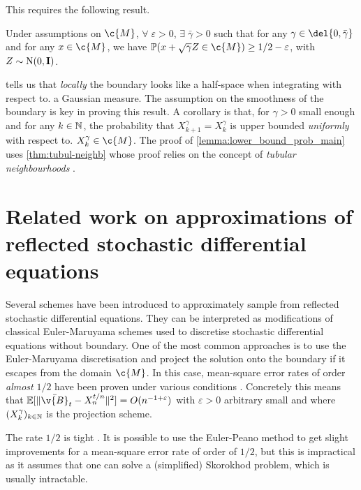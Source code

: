 This requires the following result.
\begin{proposition}
	\label{lemma:lower_bound_prob_main}
	Under assumptions on \(\c{M}\), \(\forall \; \varepsilon > 0\), \(\exists \; \bar{\gamma} >0\) such that for any \(\gamma \in \del{0, \bar{\gamma}}\) and for any \(x \in \c{M}\), we have \(\mathbb{P}(x + \sqrt{\gamma} Z \in \c{M}) \geq 1/2-\varepsilon\), with \(Z \sim \mathrm{N}(0, \m{I})\).
\end{proposition}

 tells us that \emph{locally} the boundary
looks like a half-space when integrating with respect to. a Gaussian measure.
The assumption on the smoothness of the boundary is key in proving this result.
A corollary is that, for \(\gamma > 0\) small enough and for any \(k \in \mathbb{N}\), the probability that \(X_{k+1}^\gamma = X_k^\gamma\) is upper bounded \emph{uniformly} with respect to.
\(X_k^\gamma \in \c{M}\).
The proof of \cref{lemma:lower_bound_prob_main} uses \cref{thm:tubul-neighb} whose proof relies on the concept of \emph{tubular neighbourhoods} \parencite{lee2013smooth}.

\section{Related work on approximations of reflected stochastic differential equations}

Several schemes have been introduced to approximately sample from reflected stochastic differential equations.
They can be interpreted as modifications of classical Euler-Maruyama schemes used to discretise stochastic differential equations without boundary.
One of the most common approaches is to use the Euler-Maruyama discretisation and project the solution onto the boundary if it escapes from the domain \(\c{M}\).
In this case, mean-square error rates of order \emph{almost} \(1/2\) have been proven under various conditions \parencite{liu1995discretization,chitashvili1981strong,pettersson1995approximations,slominski1994approximation}.
Concretely this means that \(\E[\| \bar{\v{B}}_{t} - X_{n}^{t/n}\|^2] = O(n^{-1+\varepsilon})\) with \(\varepsilon>0\) arbitrary small and where \((X_k^\gamma)_{k \in \mathbb{N}}\) is the projection scheme.

The rate \(1/2\) is tight \parencite{pacchiarotti1998numerical}.
It is possible to use the Euler-Peano method to get slight improvements for a mean-square error rate of order of \(1/2\), but this is impractical as it assumes that one can solve a (simplified) Skorokhod problem, which is usually intractable.

